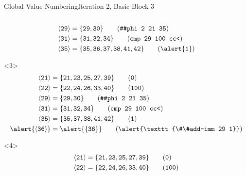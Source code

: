 \documentclass{beamer}
\newcommand{\vn}[1]{\ensuremath{\langle\texttt{#1}\rangle}}
\newcommand{\vreg}[1]{\texttt{#1}}
\begin{document}
\begin{frame}[fragile]{Global Value Numbering}{Iteration 2, Basic Block 3}
\begin{columns}[t,onlytextwidth]
\begin{column}{.5\textwidth}
\begin{onlyenv}
\begin{align*}
          \vn{29} &= \{\vreg{29},
                       \vreg{30}\} \tag{\texttt{\#\#phi 2 21 35}} \\
          \vn{31} &= \{\vreg{31},
                       \vreg{32},
                       \vreg{34}\} \tag{\texttt{cmp 29 100 cc<}} \\
          \vn{35} &= \{\vreg{35},
                       \vreg{36},
                       \vreg{37},
                       \vreg{38},
                       \vreg{41},
                       \vreg{42}\} \tag{\alert{\texttt{1}}}
        \end{align*}
      \end{onlyenv}
      \begin{onlyenv}<3>
        \begin{align*}
          \vn{21} &= \{\vreg{21},
                       \vreg{23},
                       \vreg{25},
                       \vreg{27},
                       \vreg{39}\} \tag{\texttt{0}} \\
          \vn{22} &= \{\vreg{22},
                       \vreg{24},
                       \vreg{26},
                       \vreg{33},
                       \vreg{40}\} \tag{\texttt{100}} \\
          \vn{29} &= \{\vreg{29},
                       \vreg{30}\} \tag{\texttt{\#\#phi 2 21 35}} \\
          \vn{31} &= \{\vreg{31},
                       \vreg{32},
                       \vreg{34}\} \tag{\texttt{cmp 29 100 cc<}} \\
          \vn{35} &= \{\vreg{35},
                       \vreg{37},
                       \vreg{38},
                       \vreg{41},
                       \vreg{42}\} \tag{\texttt{1}} \\
          \alert{\vn{36}} &= \alert{\{\vreg{36}\}} \tag{\alert{\texttt{\#\#add-imm 29 1}}}
        \end{align*}
      \end{onlyenv}
      \begin{onlyenv}<4>
        \begin{align*}
          \vn{21} &= \{\vreg{21},
                       \vreg{23},
                       \vreg{25},
                       \vreg{27},
                       \vreg{39}\} \tag{\texttt{0}} \\
          \vn{22} &= \{\vreg{22},
                       \vreg{24},
                       \vreg{26},
                       \vreg{33},
                       \vreg{40}\} \tag{\texttt{100}} \\

\end{align*}
\end{onlyenv}
\end{column}
\end{columns}
\end{frame}
\end{document}

